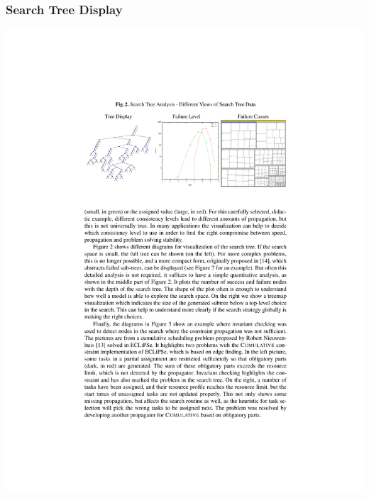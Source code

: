 \begin{frame}
  \frametitle{Search Tree Display \cite{DBLP:conf/cp/SimonisDFMQC10}}
  
  \includegraphics[height=.7\textheight]{images/simonis_cp_vis_tree.pdf}
  
\end{frame}

